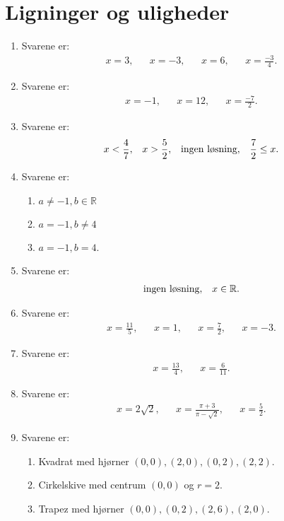 \newpage
\section{Ligninger og uligheder}
\begin{enumerate}
\item Svarene er:
\begin{align*}
x=3,&& x=-3,&&x=6,&& x=\frac{-3}{4}.
\end{align*}

\item Svarene er:
\begin{align*}
x=-1,&& x=12,&& x=\frac{-7}{2}.
\end{align*}

\item Svarene er: 
\begin{align*}
x<\frac{4}{7},&& x>\frac{5}{2},&& \textup{ingen løsning},&& \frac{7}{2}\leq x.
\end{align*}

\item Svarene er:
\begin{enumerate}
\item $a\neq -1, b\in \mathbb{R}$
\item $a=-1,b\neq 4$
\item $a=-1,b=4$.
\end{enumerate}

\item Svarene er:
\begin{align*}
 \textup{ingen løsning},&& x\in \mathbb{R}.
\end{align*}

\item Svarene er:
\begin{align*}
x=\frac{11}{5},&& x=1,&& x=\frac{7}{2},&& x=-3.
\end{align*}

\item Svarene er:
\begin{align*}
x=\frac{13}{4},&& x=\frac{6}{11}.
\end{align*}

\item Svarene er:
\begin{align*}
x=2\sqrt{2},&& x=\frac{\pi+3}{\pi-\sqrt{2}},&&x=\frac{5}{2}.
\end{align*}

\item Svarene er:
\begin{enumerate}
	\item Kvadrat med hjørner $(0,0),(2,0),(0,2),(2,2)$.
	\item Cirkelskive med centrum $(0,0)$ og $r=2$.
	\item Trapez med hjørner $(0,0),(0,2),(2,6),(2,0)$.
\end{enumerate}



\end{enumerate}
